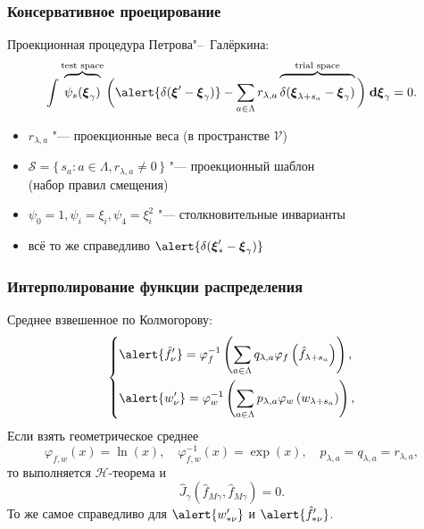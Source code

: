 \documentclass[mathserif]{beamer} %
\newcommand{\dd}{\:\mathrm{d}}
\newcommand{\dxi}{\boldsymbol{\dd\xi}}
\newcommand{\bxi}{\boldsymbol{\xi}}
\newcommand{\Set}[2]{\{\,{#1}:{#2}\,\}}
\newcommand{\xoverbrace}[2][\vphantom{\int}]{\overbrace{#1#2}}
\renewcommand{\phi}{\varphi}
\begin{document}
\begin{frame}
    \frametitle{Консервативное проецирование}
    \vspace{10pt}

    Проекционная процедура Петрова"--~Галёркина:
    \begin{equation}\label{eq:Petrov-Galerkin}
        \int \xoverbrace{ \psi_s(\bxi_\gamma) }^\text{test space} \bigg(
            \alert{\delta(\bxi'-\bxi_\gamma)} - \sum_{a\in\Lambda} r_{\lambda,a}
            \xoverbrace{ \delta(\bxi_{\lambda+s_a}-\bxi_\gamma) }^\text{trial space}
        \bigg) \dxi_\gamma = 0.
    \end{equation}
    \begin{itemize}
        \item \(r_{\lambda,a}\) "--- проекционные веса (в пространстве \(\mathcal{V}\))
        \item \(\mathcal{S} = \Set{s_a}{a\in\Lambda, r_{\lambda,a}\neq0}\) "--- проекционный шаблон \\(набор правил смещения)
        \item \(\psi_0 = 1, \psi_i = \xi_i, \psi_4 = \xi_i^2\) "--- столкновительные инварианты
        \item всё то же справедливо \(\alert{\delta(\bxi'_*-\bxi_\gamma)}\)
    \end{itemize}
\end{frame}

\begin{frame}
    \frametitle{Интерполирование функции распределения}
    Среднее взвешенное по Колмогорову:
    \begin{equation}\label{eq:Kolmogorov_mean}
        \begin{dcases}
            \alert{\hat{f}'_{\nu}} = \phi^{-1}_f\left(\sum_{a\in\Lambda} q_{\lambda,a}
                \phi_f\left(\hat{f}_{\lambda+s_a}\right)\right), \\
            \alert{w'_{\nu}} = \phi^{-1}_w\left(\sum_{a\in\Lambda} p_{\lambda,a}
                \phi_w\left(w_{\lambda+s_a}\right)\right), \\
        \end{dcases}
    \end{equation}
    Если взять геометрическое среднее
    \begin{equation}\label{eq:geometric_mean}
       \phi_{f,w}(x) = \ln(x), \quad \phi_{f,w}^{-1}(x) = \exp(x), \quad p_{\lambda,a} = q_{\lambda,a} = r_{\lambda,a},
    \end{equation}
    то выполняется \(\mathcal{H}\)-теорема и
    \begin{equation}\label{eq:strict_interpolation}
        \hat{J}_\gamma(\hat{f}_{M\gamma}, \hat{f}_{M\gamma}) = 0.
    \end{equation}
    То же самое справедливо для \(\alert{w'_{*\nu}}\) и \(\alert{\hat{f}'_{*\nu}}\).
\end{frame}
\end{document}
